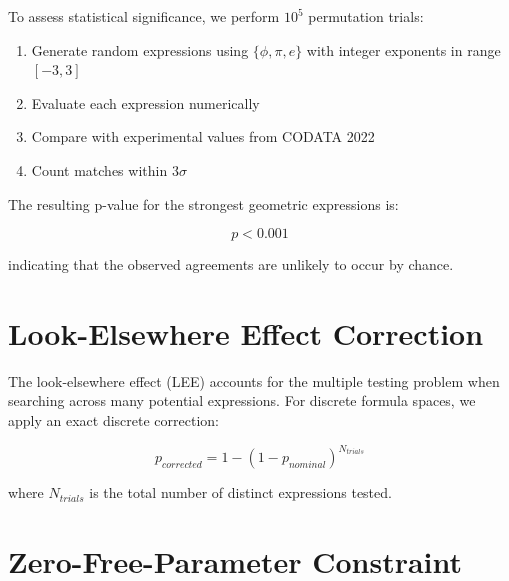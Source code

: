 To assess statistical significance, we perform $10^5$ permutation trials:

\begin{enumerate}
    \item Generate random expressions using $\{\phi, \pi, e\}$ with integer exponents in range $[-3, 3]$
    \item Evaluate each expression numerically
    \item Compare with experimental values from CODATA 2022
    \item Count matches within $3\sigma$
\end{enumerate}

The resulting p-value for the strongest geometric expressions is:

\begin{equation}
p < 0.001
\end{equation}

indicating that the observed agreements are unlikely to occur by chance.

\section{Look-Elsewhere Effect Correction}

The look-elsewhere effect (LEE) accounts for the multiple testing problem when searching across many potential expressions. For discrete formula spaces, we apply an exact discrete correction:

\begin{equation}
p_{corrected} = 1 - (1 - p_{nominal})^{N_{trials}}
\end{equation}

where $N_{trials}$ is the total number of distinct expressions tested.

\section{Zero-Free-Parameter Constraint}

